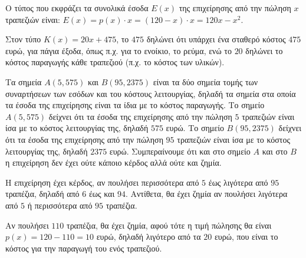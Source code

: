 
\begin{alist}
\item Ο τύπος που εκφράζει τα συνολικά έσοδα $E(x)$ της επιχείρησης από την πώληση $x$ τραπεζιών είναι: $E(x) = p(x) \cdot x = (120 - x) \cdot x = 120x - x^2$.

\item Στον τύπο $K(x) = 20x + 475$, το $475$ δηλώνει ότι υπάρχει ένα σταθερό κόστος $475$ ευρώ, για πάγια έξοδα, όπως π.χ. για το ενοίκιο, το ρεύμα, ενώ το $20$ δηλώνει το κόστος παραγωγής κάθε τραπεζιού (π.χ. το κόστος των υλικών).

\item
\begin{rlist}
\item Τα σημεία $A(5, 575)$ και $B(95, 2375)$ είναι τα δύο σημεία τομής των συναρτήσεων των εσόδων και του κόστους λειτουργίας, δηλαδή τα σημεία στα οποία τα έσοδα της επιχείρησης είναι τα ίδια με το κόστος παραγωγής.
Το σημείο $A(5, 575)$ δείχνει ότι τα έσοδα της επιχείρησης από την πώληση $5$ τραπεζιών είναι ίσα με το κόστος λειτουργίας της, δηλαδή $575$ ευρώ.
Το σημείο $B(95, 2375)$ δείχνει ότι τα έσοδα της επιχείρησης από την πώληση $95$ τραπεζιών είναι ίσα με το κόστος λειτουργίας της, δηλαδή $2375$ ευρώ.
Συμπεραίνουμε ότι και στο σημείο $A$ και στο $B$ η επιχείρηση δεν έχει ούτε κάποιο κέρδος αλλά ούτε και ζημία.

\item Η επιχείρηση έχει κέρδος, αν πουλήσει περισσότερα από $5$ έως λιγότερα από $95$ τραπέζια, δηλαδή από $6$ έως και $94$. Αντίθετα, θα έχει ζημία αν πουλήσει λιγότερα από $5$ ή περισσότερα από $95$ τραπέζια.

\item Αν πουλήσει $110$ τραπέζια, θα έχει ζημία, αφού τότε η τιμή πώλησης θα είναι $p(x) = 120 - 110 = 10$ ευρώ, δηλαδή λιγότερο από τα $20$ ευρώ, που είναι το κόστος για την παραγωγή του ενός τραπεζιού.
\end{rlist}
\end{alist}

